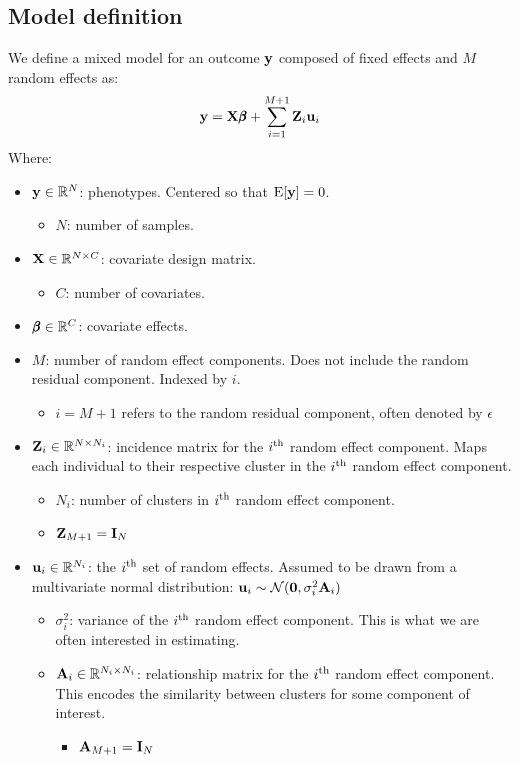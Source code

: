 \documentclass[12pt]{article}
\begin{document}
\subsection{Model definition}
We define a mixed model for an outcome $\mathbf{y}$ composed of fixed effects and $M$ random effects as:
$$ \mathbf{y} = \mathbf{X} \pmb{\beta} + \sum_{i=1}^{M+1} \mathbf{Z}_i \mathbf{u}_i $$
Where:
\begin{itemize}
    \item $\mathbf{y} \in \mathbb{R}^N$: phenotypes.
    Centered so that $\mathrm{E}[\mathbf{y}]=0$.
    \begin{itemize}
        \item $N$: number of samples.
    \end{itemize}
    \item $\mathbf{X} \in \mathbb{R}^{N \times C}$: covariate design matrix.
    \begin{itemize}
        \item $C$: number of covariates.
    \end{itemize}
    \item $\pmb{\beta} \in \mathbb{R}^C$: covariate effects.
    \item $M$: number of random effect components.
    Does not include the random residual component.
    Indexed by $i$.
    \begin{itemize}
        \item $i = M+1$ refers to the random residual component, often denoted by $\epsilon$
    \end{itemize}
    \item $\mathbf{Z}_i \in \mathbb{R}^{N \times N_i}$: incidence matrix for the $i \textsuperscript{th}$ random effect component.
    Maps each individual to their respective cluster in the $i \textsuperscript{th}$ random effect component.
    \begin{itemize}
        \item $N_i$: number of clusters in $i \textsuperscript{th}$ random effect component.
        \item $\mathbf{Z}_{M+1} = \mathbf{I}_{N}$
    \end{itemize}
    \item $\mathbf{u}_i \in \mathbb{R}^{N_i}$: the $i \textsuperscript{th}$ set of random effects.
    Assumed to be drawn from a multivariate normal distribution:
    $\mathbf{u}_i \sim \mathcal{N}(\textbf{0}, \sigma^2_i \mathbf{A}_i)$
    \begin{itemize}
        \item $\sigma^2_i$: variance of the $i \textsuperscript{th}$ random effect component.
        This is what we are often interested in estimating.
        \item $\mathbf{A}_i \in \mathbb{R}^{N_i \times N_i}$: relationship matrix for the $i \textsuperscript{th}$ random effect component.
        This encodes the similarity between clusters for some component of interest.
        \begin{itemize}
            \item $\mathbf{A}_{M+1} = \mathbf{I}_N$
        \end{itemize}
    \end{itemize}
\end{itemize}
\end{document}
